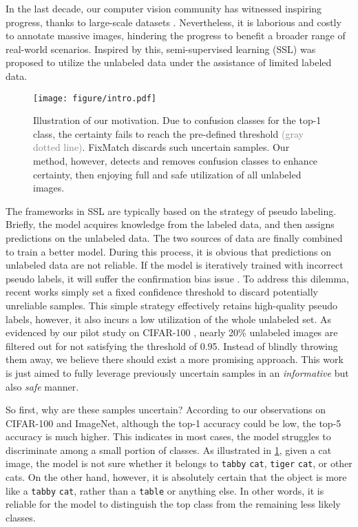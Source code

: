 \documentclass[10pt,twocolumn,letterpaper]{article}
\begin{document}
In the last decade, our computer vision community has witnessed inspiring progress, thanks to large-scale datasets \cite{coco, citys}. Nevertheless, it is laborious and costly to annotate massive images, hindering the progress to benefit a broader range of real-world scenarios. Inspired by this, semi-supervised learning (SSL) was proposed to utilize the unlabeled data under the assistance of limited labeled data.

\begin{figure}
    \centering
    \texttt{[image: figure/intro.pdf]}
    \caption{Illustration of our motivation. Due to confusion classes for the top-1 class, the certainty fails to reach the pre-defined threshold \textcolor{gray}{(gray dotted line)}. FixMatch discards such uncertain samples. Our method, however, detects and removes confusion classes to enhance certainty, then enjoying full and safe utilization of all unlabeled images.}
    \label{fig:intro}
\vspace{-4mm}
\end{figure}

The frameworks in SSL are typically based on the strategy of pseudo labeling. Briefly, the model acquires knowledge from the labeled data, and then assigns predictions on the unlabeled data. The two sources of data are finally combined to train a better model. During this process, it is obvious that predictions on unlabeled data are not reliable. If the model is iteratively trained with incorrect pseudo labels, it will suffer the confirmation bias issue \cite{arazo2020pseudo}. To address this dilemma, recent works \cite{fixmatch} simply set a fixed confidence threshold to discard potentially unreliable samples. This simple strategy effectively retains high-quality pseudo labels, however, it also incurs a low utilization of the whole unlabeled set. As evidenced by our pilot study on CIFAR-100 \cite{cifar}, nearly 20\% unlabeled images are filtered out for not satisfying the threshold of 0.95. Instead of blindly throwing them away, we believe there should exist a more promising approach. This work is just aimed to fully leverage previously uncertain samples in an \emph{informative} but also \emph{safe} manner.

So first, why are these samples uncertain? According to our observations on CIFAR-100 and ImageNet, although the top-1 accuracy could be low, the top-5 accuracy is much higher. This indicates in most cases, the model struggles to discriminate among a small portion of classes. As illustrated in \cref{fig:intro}, given a cat image, the model is not sure whether it belongs to \texttt{tabby} \texttt{cat}, \texttt{tiger} \texttt{cat}, or other cats. On the other hand, however, it is absolutely certain that the object is more like a \texttt{tabby} \texttt{cat}, rather than a \texttt{table} or anything else. In other words, it is reliable for the model to distinguish the top class from the remaining less likely classes.
\end{document}
